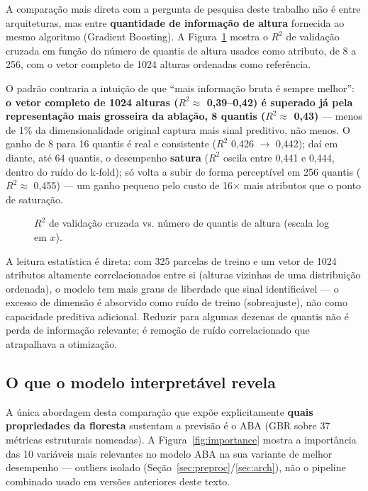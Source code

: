 A comparação mais direta com a pergunta de pesquisa deste trabalho não é entre
arquiteturas, mas entre \textbf{quantidade de informação de altura} fornecida ao
mesmo algoritmo (Gradient Boosting). A Figura~\ref{fig:ablation} mostra o $R^2$ de
validação cruzada em função do número de quantis de altura usados como atributo,
de 8 a 256, com o vetor completo de 1024 alturas ordenadas como referência.

O padrão contraria a intuição de que ``mais informação bruta é sempre melhor'':
\textbf{o vetor completo de 1024 alturas ($R^2 \approx$ 0,39--0,42) é superado já
pela representação mais grosseira da ablação, 8 quantis ($R^2 \approx$ 0,43)} ---
menos de 1\% da dimensionalidade original captura mais sinal preditivo, não menos.
O ganho de 8 para 16 quantis é real e consistente ($R^2$ 0,426 $\rightarrow$
0,442); daí em diante, até 64 quantis, o desempenho \textbf{satura} ($R^2$ oscila
entre 0,441 e 0,444, dentro do ruído do k-fold); só volta a subir de forma
perceptível em 256 quantis ($R^2 \approx$ 0,455) --- um ganho pequeno pelo custo de
16$\times$ mais atributos que o ponto de saturação.

\begin{figure}[H]
  \centering
  \caption{$R^2$ de validação cruzada vs. número de quantis de altura (escala log
  em $x$).}
  \label{fig:ablation}
\end{figure}

A leitura estatística é direta: com 325 parcelas de treino e um vetor de 1024
atributos altamente correlacionados entre si (alturas vizinhas de uma distribuição
ordenada), o modelo tem mais graus de liberdade que sinal identificável --- o
excesso de dimensão é absorvido como ruído de treino (sobreajuste), não como
capacidade preditiva adicional. Reduzir para algumas dezenas de quantis não é
perda de informação relevante; é remoção de ruído correlacionado que atrapalhava a
otimização.

\subsection{O que o modelo interpretável revela}
\label{sec:interpret}

A única abordagem desta comparação que expõe explicitamente \textbf{quais
propriedades da floresta} sustentam a previsão é o ABA (GBR sobre 37 métricas
estruturais nomeadas). A Figura~\ref{fig:importance} mostra a importância das 10
variáveis mais relevantes no modelo ABA na sua variante de melhor desempenho ---
outliers isolado (Seção~\ref{sec:preproc}/\ref{sec:arch}), não o pipeline
combinado usado em versões anteriores deste texto.

